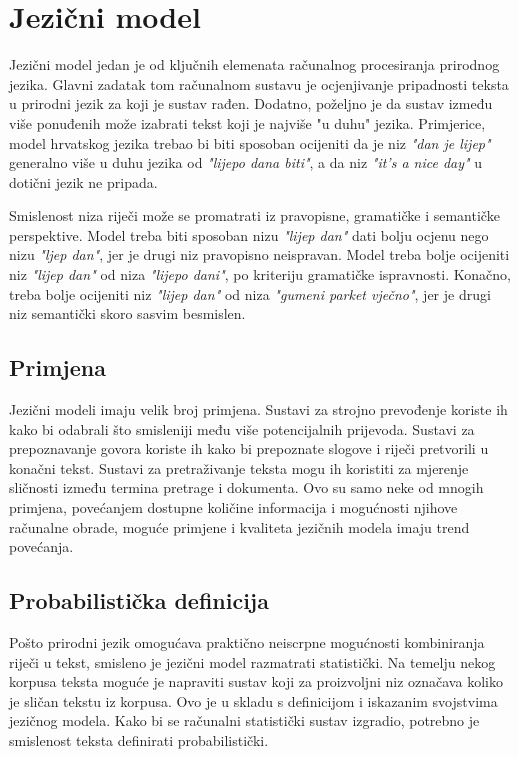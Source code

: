 \documentclass[times, utf8, diplomski, numeric]{fer}
\begin{document}
\chapter{Jezični model}
\label{sec:jezicni_modeli}

Jezični model jedan je od ključnih elemenata računalnog procesiranja prirodnog jezika. Glavni zadatak tom računalnom sustavu je ocjenjivanje pripadnosti teksta u prirodni jezik za koji je sustav rađen. Dodatno, poželjno je da sustav između više ponuđenih može izabrati tekst koji je najviše "u duhu" jezika. Primjerice, model hrvatskog jezika trebao bi biti sposoban ocijeniti da je niz \textit{"dan je lijep"} generalno više u duhu jezika od \textit{"lijepo dana biti"}, a da niz \textit{"it's a nice day"} u dotični jezik ne pripada.

Smislenost niza riječi može se promatrati iz pravopisne, gramatičke i semantičke perspektive. Model treba biti sposoban nizu \textit{"lijep dan"} dati bolju ocjenu nego nizu \textit{"ljep dan"}, jer je drugi niz pravopisno neispravan. Model treba bolje ocijeniti niz \textit{"lijep dan"} od niza \textit{"lijepo dani"}, po kriteriju gramatičke ispravnosti. Konačno, treba bolje ocijeniti niz \textit{"lijep dan"} od niza \textit{"gumeni parket vječno"}, jer je drugi niz semantički skoro sasvim besmislen.

\section{Primjena}

Jezični modeli imaju velik broj primjena. Sustavi za strojno prevođenje koriste ih kako bi odabrali što smisleniji među više potencijalnih prijevoda. Sustavi za prepoznavanje govora koriste ih kako bi prepoznate slogove i riječi pretvorili u konačni tekst. Sustavi za pretraživanje teksta mogu ih koristiti za mjerenje sličnosti između termina pretrage i dokumenta. Ovo su samo neke od mnogih primjena, povećanjem dostupne količine informacija i mogućnosti njihove računalne obrade, moguće primjene i kvaliteta jezičnih modela imaju trend povećanja.

\section{Probabilistička definicija}

Pošto prirodni jezik omogućava praktično neiscrpne mogućnosti kombiniranja riječi u tekst, smisleno je jezični model razmatrati statistički. Na temelju nekog korpusa teksta moguće je napraviti sustav koji za proizvoljni niz označava koliko je sličan tekstu iz korpusa. Ovo je u skladu s definicijom i iskazanim svojstvima jezičnog modela. Kako bi se računalni statistički sustav izgradio, potrebno je smislenost teksta definirati probabilistički.
\end{document}
